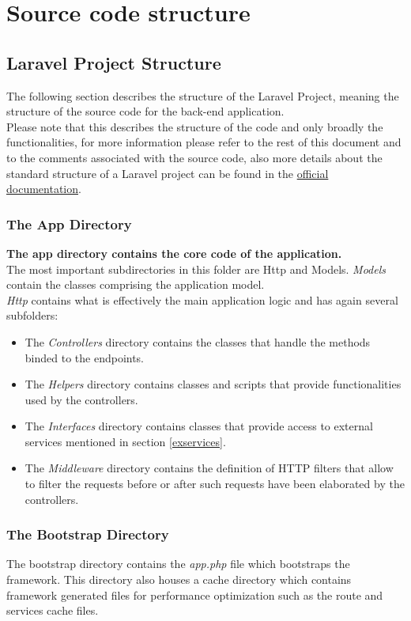 \section{Source code structure}

\subsection{Laravel Project Structure}
The following section describes the structure of the Laravel Project, meaning the structure of the source code for the back-end application.\\
Please note that this describes the structure of the code and only broadly the functionalities, for more information please refer to the rest of this document and to the comments associated with the source code, also more details about the standard structure of a Laravel project can be found in the \href{https://laravel.com/docs/5.5/structure}{official documentation}.

\subsubsection*{The App Directory}
\textbf{The app directory contains the core code of the application.}\\
The most important subdirectories in this folder are Http and Models.
\textit{Models} contain the classes comprising the application model.\\
\textit{Http} contains what is effectively the main application logic and has again several subfolders:
\begin{itemize}
	\item The \textit{Controllers} directory contains the classes that handle the methods binded to the endpoints.
	\item The \textit{Helpers} directory contains classes and scripts that provide functionalities used by the controllers.
	\item The \textit{Interfaces} directory contains classes that provide access to external services mentioned in section \ref{exservices}.
	\item The \textit{Middleware} directory contains the definition of HTTP filters that allow to filter the requests before or after such requests have been elaborated by the controllers.
\end{itemize}

\subsubsection*{The Bootstrap Directory}
The bootstrap directory contains the \textit{app.php} file which bootstraps the framework. This directory also houses a cache directory which contains framework generated files for performance optimization such as the route and services cache files.

